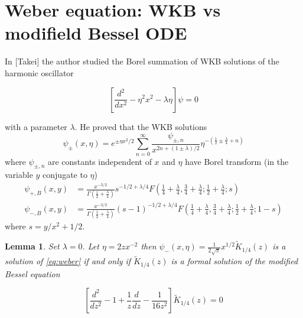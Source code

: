 \documentclass{article}
\theoremstyle{definition}
\theoremstyle{plain}
\newtheorem{lemma}{Lemma}
\begin{document}
\section{Weber equation: WKB vs modifield Bessel ODE}

In [Takei] the author studied the Borel summation of WKB solutions of the harmonic oscillator 

\begin{equation}\label{eq:weber}
\left[\frac{d^2}{dx^2}-\eta^2x^2-\lambda\eta\right]\psi=0
\end{equation}

with a parameter $\lambda$. He proved that the WKB solutions
\begin{equation}
\psi_{\pm}(x,\eta)=e^{\pm\eta x^2/2}\sum_{n=0}^{\infty}\frac{\psi_{\pm,n}}{x^{2n+(1\pm\lambda)/2}}\eta^{-\left(\frac{1}{2}\pm\frac{\lambda}{4}+n\right)}
\end{equation}
 where $\psi_{\pm,n}$ are constants independent of $x$ and $\eta$ have Borel transform (in the variable $y$ conjugate to $\eta$) 
 \begin{align}
 \psi_{+,B}(x,y)&=\frac{x^{-3/2}}{\Gamma\left(\frac{1}{2}+\frac{\lambda}{4}\right)}s^{-1/2+\lambda/4} F\left(\frac{1}{4}+\frac{\lambda}{4},\frac{3}{4}+\frac{\lambda}{4};\frac{1}{2}+\frac{\lambda}{4};s\right)\\
 \psi_{-,B}(x,y)&=\frac{x^{-3/2}}{\Gamma\left(\frac{1}{2}+\frac{\lambda}{4}\right)}(s-1)^{-1/2+\lambda/4} F\left(\frac{1}{4}+\frac{\lambda}{4},\frac{3}{4}+\frac{\lambda}{4};\frac{1}{2}+\frac{\lambda}{4};1-s\right)
 \end{align}
where $s=y/x^2+1/2$. 

\begin{lemma}
Set $\lambda=0$. Let $\eta=2zx^{-2}$ then $\psi_-(x,\eta)=\frac{1}{2\sqrt{\pi}}x^{1/2}\tilde{K}_{1/4}(z)$ is a solution of \eqref{eq:weber} if and only if $\tilde{K}_{1/4}(z)$ is a formal solution of the modified Bessel equation

\begin{equation}\label{eq:Bessel 1/4}
\left[\frac{d^2}{dz^2}-1+\frac{1}{z}\frac{d}{dz}-\frac{1}{16 z^2}\right]\tilde{K}_{1/4}(z)=0
\end{equation}

\end{lemma}
\end{document}

